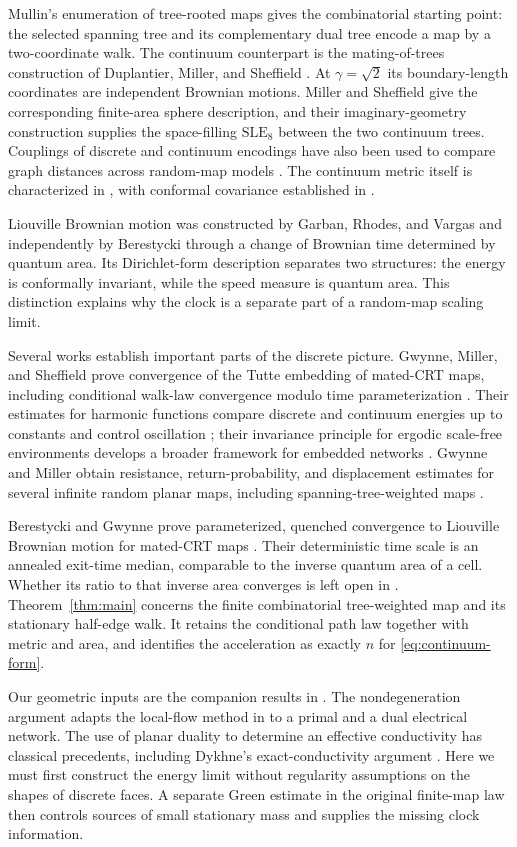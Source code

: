 Mullin's enumeration of tree-rooted maps \cite{Mullin} gives the
combinatorial starting point: the selected spanning tree and its
complementary dual tree encode a map by a two-coordinate walk. The
continuum counterpart is the mating-of-trees construction of
Duplantier, Miller, and Sheffield \cite{DMS}. At $\gamma=\sqrt2$ its
boundary-length coordinates are independent Brownian motions. Miller
and Sheffield \cite{MSSphere} give the corresponding finite-area
sphere description, and their imaginary-geometry construction
\cite{IG4} supplies the space-filling $\mathrm{SLE}_8$ between the two
continuum trees. Couplings of discrete and continuum encodings have
also been used to compare graph distances across random-map models
\cite{GHS}. The continuum metric itself is characterized in
\cite{GMMetric}, with conformal covariance established in
\cite{GMConformal}.

Liouville Brownian motion was constructed by Garban, Rhodes, and Vargas
\cite{GRV} and independently by Berestycki \cite{Berestycki} through a
change of Brownian time determined by quantum area. Its Dirichlet-form
description \cite{GRVForm} separates two structures: the energy is
conformally invariant, while the speed measure is quantum area. This
distinction explains why the clock is a separate part of a random-map
scaling limit.

Several works establish important parts of the discrete picture.
Gwynne, Miller, and Sheffield prove convergence of the Tutte embedding
of mated-CRT maps, including conditional walk-law convergence modulo
time parameterization \cite{GMS}. Their estimates for harmonic
functions compare discrete and continuum energies up to constants and control
oscillation \cite{GMSHarmonic}; their invariance principle for ergodic
scale-free environments develops a broader framework for embedded
networks \cite{GMS2}. Gwynne and Miller obtain resistance,
return-probability, and displacement estimates for several infinite
random planar maps, including spanning-tree-weighted maps \cite{GM}.

Berestycki and Gwynne prove parameterized, quenched convergence to
Liouville Brownian motion for mated-CRT maps \cite{BG}. Their
deterministic time scale is an annealed exit-time median, comparable
to the inverse quantum area of a cell. Whether its ratio to that
inverse area converges is left open in \cite[Remark~1.3]{BG}.
Theorem~\ref{thm:main} concerns
the finite combinatorial tree-weighted map and its stationary
half-edge walk. It retains the conditional path law together with
metric and area, and identifies the acceleration as exactly $n$
for \eqref{eq:continuum-form}.

Our geometric inputs are the companion results in \cite{MetricMaps}.
The nondegeneration argument adapts the local-flow method in
\cite[Section~``The canonical conformal structure'']{ConformalMaps}
to a primal and a dual electrical network. The use of planar duality
to determine an effective conductivity has classical precedents,
including Dykhne's exact-conductivity argument \cite{Dykhne}. Here
we must first construct the energy limit without regularity
assumptions on the shapes of discrete faces. A separate Green
estimate in the original finite-map law then controls sources of
small stationary mass and supplies the missing clock information.
